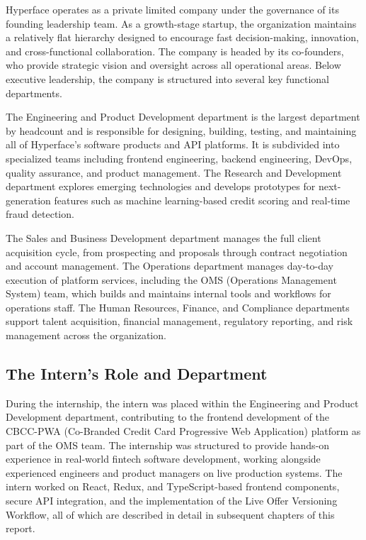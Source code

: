 Hyperface operates as a private limited company under the governance of its founding leadership team. As a growth-stage startup, the organization maintains a relatively flat hierarchy designed to encourage fast decision-making, innovation, and cross-functional collaboration. The company is headed by its co-founders, who provide strategic vision and oversight across all operational areas. Below executive leadership, the company is structured into several key functional departments.

The Engineering and Product Development department is the largest department by headcount and is responsible for designing, building, testing, and maintaining all of Hyperface's software products and API platforms. It is subdivided into specialized teams including frontend engineering, backend engineering, DevOps, quality assurance, and product management. The Research and Development department explores emerging technologies and develops prototypes for next-generation features such as machine learning-based credit scoring and real-time fraud detection.

The Sales and Business Development department manages the full client acquisition cycle, from prospecting and proposals through contract negotiation and account management. The Operations department manages day-to-day execution of platform services, including the OMS (Operations Management System) team, which builds and maintains internal tools and workflows for operations staff. The Human Resources, Finance, and Compliance departments support talent acquisition, financial management, regulatory reporting, and risk management across the organization.

\subsection{The Intern's Role and Department}

During the internship, the intern was placed within the Engineering and Product Development department, contributing to the frontend development of the CBCC-PWA (Co-Branded Credit Card Progressive Web Application) platform as part of the OMS team. The internship was structured to provide hands-on experience in real-world fintech software development, working alongside experienced engineers and product managers on live production systems. The intern worked on React, Redux, and TypeScript-based frontend components, secure API integration, and the implementation of the Live Offer Versioning Workflow, all of which are described in detail in subsequent chapters of this report.

